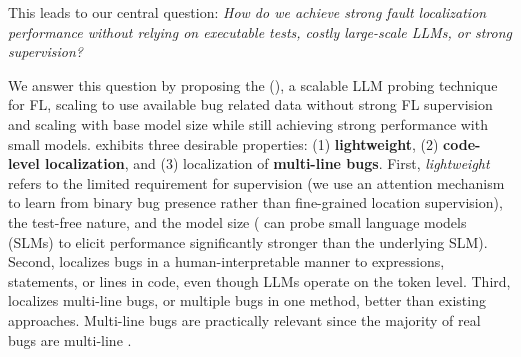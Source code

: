 
This leads to our central question: 
\textit{How do we achieve strong fault localization performance without relying on executable tests, costly large-scale LLMs, or strong supervision?}


We answer this question by proposing the \ourmethodlong{} (\ourmethod{}), a scalable LLM probing technique for FL, scaling to use available bug related data without strong FL supervision and scaling with base model size while still achieving strong performance with small models. \ourmethod{} exhibits three desirable properties:
(1) \textbf{lightweight}, (2) \textbf{code-level localization}, and (3) localization of \textbf{multi-line bugs}. First, \textit{lightweight} refers to the limited requirement for supervision (we use an attention mechanism to learn from binary bug presence rather than fine-grained location supervision), the test-free nature, and the model size (\ourmethod{} can probe small language models (SLMs) to elicit performance significantly stronger than the underlying SLM). Second, \ourmethod{} localizes bugs in a human-interpretable manner to expressions, statements, or lines in code, even though LLMs operate on the token level. Third, \ourmethod{} localizes multi-line bugs, or multiple bugs in one method, better than existing approaches. Multi-line bugs are practically relevant since the majority of real bugs are multi-line \citep{pearson2016evaluating}.


